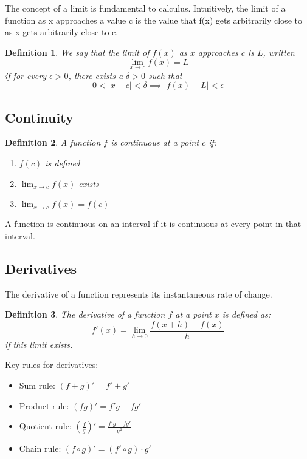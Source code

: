 \documentclass[12pt,a4paper]{article}
\newtheorem{definition}{Definition}
\begin{document}
The concept of a limit is fundamental to calculus. Intuitively, the limit of a function as x approaches a value c is the value that f(x) gets arbitrarily close to as x gets arbitrarily close to c.

\begin{definition}
We say that the limit of $f(x)$ as $x$ approaches $c$ is $L$, written
\[ \lim_{x \to c} f(x) = L \]
if for every $\epsilon > 0$, there exists a $\delta > 0$ such that
\[ 0 < |x - c| < \delta \implies |f(x) - L| < \epsilon \]
\end{definition}

\subsection{Continuity}

\begin{definition}
A function $f$ is continuous at a point $c$ if:
\begin{enumerate}
    \item $f(c)$ is defined
    \item $\lim_{x \to c} f(x)$ exists
    \item $\lim_{x \to c} f(x) = f(c)$
\end{enumerate}
\end{definition}

A function is continuous on an interval if it is continuous at every point in that interval.

\subsection{Derivatives}

The derivative of a function represents its instantaneous rate of change.

\begin{definition}
The derivative of a function $f$ at a point $x$ is defined as:
\[ f'(x) = \lim_{h \to 0} \frac{f(x + h) - f(x)}{h} \]
if this limit exists.
\end{definition}

Key rules for derivatives:
\begin{itemize}
    \item Sum rule: $(f + g)' = f' + g'$
    \item Product rule: $(fg)' = f'g + fg'$
    \item Quotient rule: $(\frac{f}{g})' = \frac{f'g - fg'}{g^2}$
    \item Chain rule: $(f \circ g)' = (f' \circ g) \cdot g'$
\end{itemize}
\end{document}
